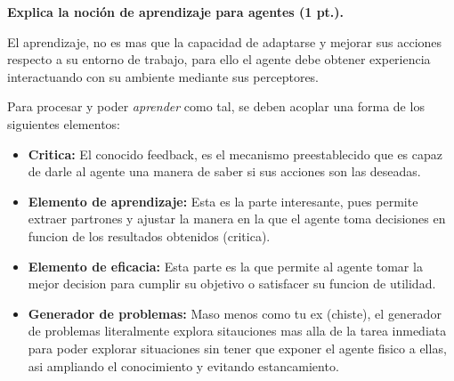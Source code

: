 \textbf{Explica la noción de aprendizaje para agentes (1 pt.).} \vspace{.3cm}

El aprendizaje, no es mas que la capacidad de adaptarse y mejorar sus acciones respecto a su entorno de trabajo, para ello el agente debe obtener experiencia interactuando con su ambiente mediante sus perceptores.

Para procesar y poder \textit{aprender} como tal, se deben acoplar una forma de los siguientes elementos:
\begin{itemize}
    \item \textbf{Critica:} El conocido feedback, es el mecanismo preestablecido que es capaz de darle al agente una manera de saber si sus acciones son las deseadas.
    \item \textbf{Elemento de aprendizaje:} Esta es la parte interesante, pues permite extraer partrones y ajustar la manera en la que el agente toma decisiones en funcion de los resultados obtenidos (critica).
    \item \textbf{Elemento de eficacia:} Esta parte es la que permite al agente tomar la mejor decision para cumplir su objetivo o satisfacer su funcion de utilidad.
    \item \textbf{Generador de problemas:} Maso menos como tu ex (chiste), el generador de problemas literalmente explora sitauciones mas alla de la tarea inmediata para poder explorar situaciones sin tener que exponer el agente fisico a ellas, asi ampliando el conocimiento y evitando estancamiento. 
\end{itemize}

\cite{SotoAstorga2025} \cite{russell2020artificial}